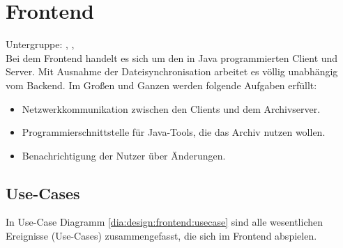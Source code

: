 \chapter{Frontend}
Untergruppe: \sab, \eddy, \cii \\
Bei dem Frontend handelt es sich um den in Java programmierten Client und Server.
Mit Ausnahme der Dateisynchronisation arbeitet es völlig unabhängig vom Backend.
Im Großen und Ganzen werden folgende Aufgaben erfüllt:
\begin{itemize}
	\item Netzwerkkommunikation zwischen den Clients und dem Archivserver.
	\item Programmierschnittstelle für Java-Tools, die das Archiv nutzen wollen.
	\item Benachrichtigung der Nutzer über Änderungen.
\end{itemize}
\section{Use-Cases}
In Use-Case Diagramm \ref{dia:design:frontend:usecase} sind alle wesentlichen Ereignisse (Use-Cases) zusammengefasst, die sich im Frontend abspielen.
